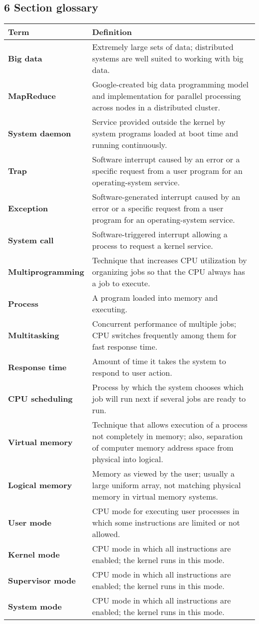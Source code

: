 \documentclass{article}
\begin{document}
\subsection*{6 Section glossary}
\centering
\begin{tabular}{>{\raggedright}p{} >{\raggedright\arraybackslash}p{}}
\toprule
\textbf{Term} & \textbf{Definition} \\
\midrule
\textbf{Big data} & Extremely large sets of data; distributed systems are well suited to working with big data. \\
\textbf{MapReduce} & Google-created big data programming model and implementation for parallel processing across nodes in a distributed cluster. \\
\textbf{System daemon} & Service provided outside the kernel by system programs loaded at boot time and running continuously. \\
\textbf{Trap} & Software interrupt caused by an error or a specific request from a user program for an operating-system service. \\
\textbf{Exception} & Software-generated interrupt caused by an error or a specific request from a user program for an operating-system service. \\
\textbf{System call} & Software-triggered interrupt allowing a process to request a kernel service. \\
\textbf{Multiprogramming} & Technique that increases CPU utilization by organizing jobs so that the CPU always has a job to execute. \\
\textbf{Process} & A program loaded into memory and executing. \\
\textbf{Multitasking} & Concurrent performance of multiple jobs; CPU switches frequently among them for fast response time. \\
\textbf{Response time} & Amount of time it takes the system to respond to user action. \\
\textbf{CPU scheduling} & Process by which the system chooses which job will run next if several jobs are ready to run. \\
\textbf{Virtual memory} & Technique that allows execution of a process not completely in memory; also, separation of computer memory address space from physical into logical. \\
\textbf{Logical memory} & Memory as viewed by the user; usually a large uniform array, not matching physical memory in virtual memory systems. \\
\textbf{User mode} & CPU mode for executing user processes in which some instructions are limited or not allowed. \\
\textbf{Kernel mode} & CPU mode in which all instructions are enabled; the kernel runs in this mode. \\
\textbf{Supervisor mode} & CPU mode in which all instructions are enabled; the kernel runs in this mode. \\
\textbf{System mode} & CPU mode in which all instructions are enabled; the kernel runs in this mode. \\
\end{tabular}
\vspace{\baselineskip}
\end{document}
